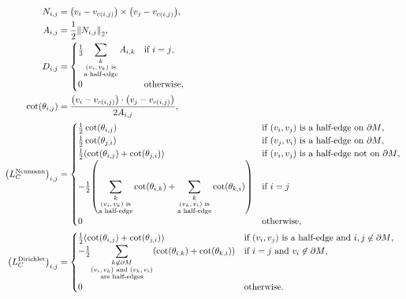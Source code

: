 \begin{align*}
	N_{i, j} &= \pof{v_i - v_{c\pof{i, j}}} \times \pof{v_j - v_{c\pof{i, j}}}, \\
	A_{i, j} &= \frac{1}{2}\norm{N_{i, j}}_2, \\
	D_{i, j} &= \begin{cases}
		\frac{1}{3}{\displaystyle\sum_{\substack{k \\ \text{\(\pof{v_i, v_k}\) is} \\ \text{a half-edge}}}A_{i, k}} & \text{if \(i = j\)}, \\
		0 & \text{otherwise},
	\end{cases} \\
	\cot\pof{\theta_{i, j}} &= \frac{\pof{v_i - v_{c\pof{i, j}}} \cdot \pof{v_j - v_{c\pof{i, j}}}}{2A_{i, j}}, \\
	\pof{L_C^{\text{Neumann}}}_{i, j} &= \begin{cases}
		\frac{1}{2}\cot\pof{\theta_{i, j}} & \text{if \(\pof{v_i, v_j}\) is a half-edge on \(\partial M\)}, \\
		\frac{1}{2}\cot\pof{\theta_{j, i}} & \text{if \(\pof{v_j, v_i}\) is a half-edge on \(\partial M\)}, \\
		\frac{1}{2}\pof{\cot\pof{\theta_{i, j}} + \cot\pof{\theta_{j, i}}} & \text{if \(\pof{v_i, v_j}\) is a half-edge not on \(\partial M\)}, \\
		-\frac{1}{2}\pof{\displaystyle\sum_{\substack{k \\ \text{\(\pof{v_i, v_k}\) is} \\ \text{a half-edge}}}\cot\pof{\theta_{i, k}} + \sum_{\substack{k \\ \text{\(\pof{v_k, v_i}\) is} \\ \text{a half-edge}}}\cot\pof{\theta_{k, i}}} & \text{if \(i = j\)} \\
		0 & \text{otherwise},
	\end{cases} \\
	\pof{L_C^{\text{Dirichlet}}}_{i, j} &= \begin{cases}
		\frac{1}{2}\pof{\cot\pof{\theta_{i, j}} + \cot\pof{\theta_{j, i}}} & \text{if \(\pof{v_i, v_j}\) is a half-edge and \(i, j \not\in \partial M\)}, \\
		-\frac{1}{2}{\displaystyle\sum_{\substack{k \not\in \partial M \\ \text{\(\pof{v_i, v_k}\) and \(\pof{v_k, v_i}\)} \\ \text{are half-edges}}}\pof{\cot\pof{\theta_{i, k}} + \cot\pof{\theta_{k, i}}}} & \text{if \(i = j\) and \(v_i \not\in \partial M\)}, \\
		0 & \text{otherwise}.
	\end{cases}
\end{align*}

